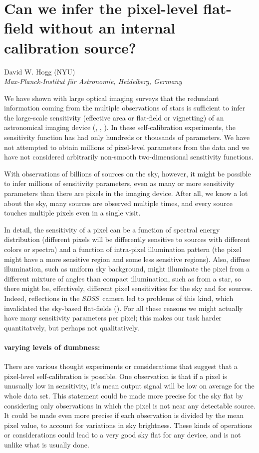 \documentclass[12pt,preprint,dvips]{aastex}
\newcommand{\project}[1]{\textsl{#1}}
\newcommand{\SDSS}{\project{SDSS}}
\begin{document}
\section*{Can we infer the pixel-level flat-field without an internal calibration source?}

\noindent
David W. Hogg (NYU)
\\
\textsl{Max-Planck-Institut f\"ur Astronomie, Heidelberg, Germany}

We have shown with large optical imaging surveys that the redundant
information coming from the multiple observations of stars is
sufficient to infer the large-scale sensitivity (effective area or
flat-field or vignetting) of an astronomical imaging device
(\citealt{ubercal}, \citealt{schlafly}, \citealt{holmes}).  In these
self-calibration experiments, the sensitivity function has had only
hundreds or thousands of parameters.  We have not attempted to obtain
millions of pixel-level parameters from the data and we have not
considered arbitrarily non-smooth two-dimensional sensitivity
functions.

With observations of billions of sources on the sky, however, it might
be possible to infer millions of sensitivity parameters, even as many
or more sensitivity parameters than there are pixels in the imaging
device.  After all, we know a lot about the sky, many sources are
observed multiple times, and every source touches multiple pixels even
in a single visit.

In detail, the sensitivity of a pixel can be a function of spectral
energy distribution (different pixels will be differently sensitive to
sources with different colors or spectra) and a function of
intra-pixel illumination pattern (the pixel might have a more
sensitive region and some less sensitive regions).  Also, diffuse
illumination, such as uniform sky background, might illuminate the
pixel from a different mixture of angles than compact illumination,
such as from a star, so there might be, effectively, different pixel
sensitivities for the sky and for sources.  Indeed, reflections in the
\SDSS\ camera led to problems of this kind, which invalidated the
sky-based flat-fields (\citealt{ubercal}).  For all these reasons we
might actually have many sensitivity parameters per pixel; this makes
our task harder quantitatvely, but perhaps not qualitatively.

\paragraph{varying levels of dumbness:}
There are various thought experiments or considerations that suggest
that a pixel-level self-calibration is possible.  One observation is
that if a pixel is unusually low in sensitivity, it's mean output
signal will be low on average for the whole data set.  This statement
could be made more precise for the sky flat by considering only
observations in which the pixel is not near any detectable source.  It
could be made even more precise if each observation is divided by the
mean pixel value, to account for variations in sky brightness.  These
kinds of operations or considerations could lead to a very good sky
flat for any device, and is not unlike what is usually done.
\end{document}
